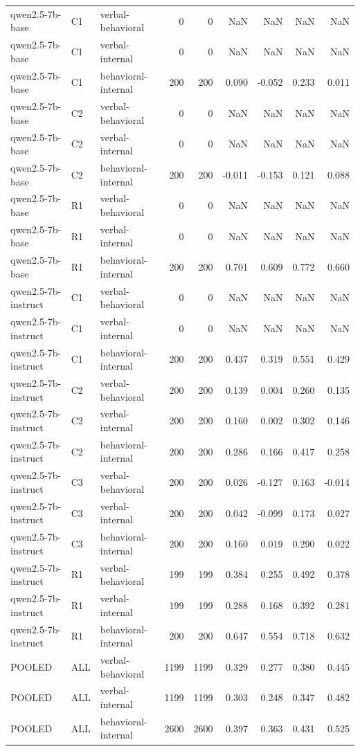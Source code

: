 \begin{table}
\begin{tabular}{lllrrrrrr}
qwen2.5-7b-base & C1 & verbal-behavioral & 0 & 0 & NaN & NaN & NaN & NaN \\
qwen2.5-7b-base & C1 & verbal-internal & 0 & 0 & NaN & NaN & NaN & NaN \\
qwen2.5-7b-base & C1 & behavioral-internal & 200 & 200 & 0.090 & -0.052 & 0.233 & 0.011 \\
qwen2.5-7b-base & C2 & verbal-behavioral & 0 & 0 & NaN & NaN & NaN & NaN \\
qwen2.5-7b-base & C2 & verbal-internal & 0 & 0 & NaN & NaN & NaN & NaN \\
qwen2.5-7b-base & C2 & behavioral-internal & 200 & 200 & -0.011 & -0.153 & 0.121 & 0.088 \\
qwen2.5-7b-base & R1 & verbal-behavioral & 0 & 0 & NaN & NaN & NaN & NaN \\
qwen2.5-7b-base & R1 & verbal-internal & 0 & 0 & NaN & NaN & NaN & NaN \\
qwen2.5-7b-base & R1 & behavioral-internal & 200 & 200 & 0.701 & 0.609 & 0.772 & 0.660 \\
qwen2.5-7b-instruct & C1 & verbal-behavioral & 0 & 0 & NaN & NaN & NaN & NaN \\
qwen2.5-7b-instruct & C1 & verbal-internal & 0 & 0 & NaN & NaN & NaN & NaN \\
qwen2.5-7b-instruct & C1 & behavioral-internal & 200 & 200 & 0.437 & 0.319 & 0.551 & 0.429 \\
qwen2.5-7b-instruct & C2 & verbal-behavioral & 200 & 200 & 0.139 & 0.004 & 0.260 & 0.135 \\
qwen2.5-7b-instruct & C2 & verbal-internal & 200 & 200 & 0.160 & 0.002 & 0.302 & 0.146 \\
qwen2.5-7b-instruct & C2 & behavioral-internal & 200 & 200 & 0.286 & 0.166 & 0.417 & 0.258 \\
qwen2.5-7b-instruct & C3 & verbal-behavioral & 200 & 200 & 0.026 & -0.127 & 0.163 & -0.014 \\
qwen2.5-7b-instruct & C3 & verbal-internal & 200 & 200 & 0.042 & -0.099 & 0.173 & 0.027 \\
qwen2.5-7b-instruct & C3 & behavioral-internal & 200 & 200 & 0.160 & 0.019 & 0.290 & 0.022 \\
qwen2.5-7b-instruct & R1 & verbal-behavioral & 199 & 199 & 0.384 & 0.255 & 0.492 & 0.378 \\
qwen2.5-7b-instruct & R1 & verbal-internal & 199 & 199 & 0.288 & 0.168 & 0.392 & 0.281 \\
qwen2.5-7b-instruct & R1 & behavioral-internal & 200 & 200 & 0.647 & 0.554 & 0.718 & 0.632 \\
POOLED & ALL & verbal-behavioral & 1199 & 1199 & 0.329 & 0.277 & 0.380 & 0.445 \\
POOLED & ALL & verbal-internal & 1199 & 1199 & 0.303 & 0.248 & 0.347 & 0.482 \\
POOLED & ALL & behavioral-internal & 2600 & 2600 & 0.397 & 0.363 & 0.431 & 0.525 \\
\bottomrule
\end{tabular}
\end{table}
